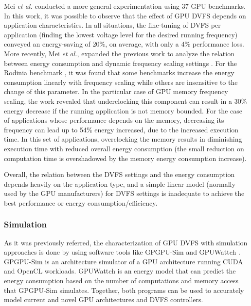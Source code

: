 Mei \textit{et al.} \cite{mei_measurement_2013} conducted a more general experimentation using 37 GPU benchmarks. In this work, it was possible to observe that the effect of GPU DVFS depends on application characteristics. In all situations, the fine-tuning of DVFS per application (finding the lowest voltage level for the desired running frequency) conveyed an energy-saving of 20\%, on average, with only a 4\% performance loss. More recently, Mei  \textit{et al.}, expanded the previous work to analyze the relation between energy consumption and dynamic frequency scaling settings \cite{mei_survey_2016}. For the  Rodinia benchmark \cite{che_rodinia:_2009}, it was found that some benchmarks increase the energy consumption linearly with frequency scaling while others are insensitive to the change of this parameter. In the particular case of GPU memory frequency scaling, the work revealed that underclocking this component can result in a 30\% energy decrease if the running application is not memory bounded. For the case of applications whose performance depends on the memory, decreasing its frequency can lead up to 54\% energy increased, due to the increased execution time. In this set of applications, overclocking the memory results in diminishing execution time with reduced overall energy consumption (the small reduction on computation time is overshadowed by the memory energy consumption increase). 

Overall, the relation between the DVFS settings and the energy consumption depends heavily on the application type, and a simple linear model (normally used by the GPU manufacturers) for DVFS settings is inadequate to achieve the best performance or energy consumption/efficiency.

\subsubsection{Simulation}

As it was previously referred, the characterization of GPU DVFS with simulation approaches is done by using software tools like GPGPU-Sim \cite{noauthor_gpgpu-sim/gpgpu-sim_distribution_2019} and GPUWattch \cite{noauthor_gpu_2011} \cite{leng_gpuwattch:_2013}. GPGPU-Sim is an architecture simulator of a GPU architecture running CUDA and OpenCL workloads. GPUWattch is an energy model that can predict the energy consumption based on the number of computations and memory access that GPGPU-Sim simulates. Together, both programs can be used to accurately model current and novel GPU architectures and DVFS controllers.

